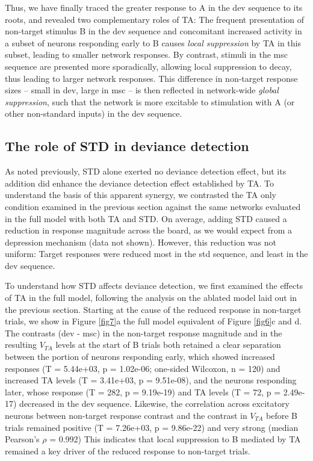 \documentclass[pdflatex,referee,iicol,sn-basic]{sn-jnl}
\theoremstyle{thmstyleone}%
\theoremstyle{thmstyletwo}%
\theoremstyle{thmstylethree}%
\begin{document}
Thus, we have finally traced the greater response to A in the dev sequence to its roots, and revealed two complementary roles of TA: The frequent presentation of non-target stimulus B in the dev sequence and concomitant increased activity in a subset of neurons responding early to B causes \emph{local suppression} by TA in this subset, leading to smaller network responses. By contrast, stimuli in the msc sequence are presented more sporadically, allowing local suppression to decay, thus leading to larger network responses. This difference in non-target response sizes -- small in dev, large in msc -- is then reflected in network-wide \emph{global suppression}, such that the network is more excitable to stimulation with A (or other non-standard inputs) in the dev sequence.

\subsection{The role of STD in deviance detection}\label{sec-std}

As noted previously, STD alone exerted no deviance detection effect, but its addition did enhance the deviance detection effect established by TA. To understand the basis of this apparent synergy, we contrasted the TA only condition examined in the previous section against the same networks evaluated in the full model with both TA and STD. On average, adding STD caused a reduction in response magnitude across the board, as we would expect from a depression mechanism (data not shown). However, this reduction was not uniform: Target responses were reduced most in the std sequence, and least in the dev sequence.

To understand how STD affects deviance detection, we first examined the effects of TA in the full model, following the analysis on the ablated model laid out in the previous section. Starting at the cause of the reduced response in non-target trials, we show in Figure \ref{fig7}a the full model equivalent of Figure \ref{fig6}c and d. The contrasts (dev - msc) in the non-target response magnitude and in the resulting $V_{TA}$ levels at the start of B trials both retained a clear separation between the portion of neurons responding early, which showed increased responses (T = 5.44e+03, p = 1.02e-06; one-sided Wilcoxon, n = 120) and increased TA levels (T = 3.41e+03, p = 9.51e-08), and the neurons responding later, whose response (T = 282, p = 9.19e-19) and TA levels (T = 72, p = 2.49e-17) decreased in the dev sequence. Likewise, the correlation across excitatory neurons between non-target response contrast and the contrast in $V_{TA}$ before B trials remained positive (T = 7.26e+03, p = 9.86e-22) and very strong (median Pearson's $\rho$ = 0.992) This indicates that local suppression to B mediated by TA remained a key driver of the reduced response to non-target trials.
\end{document}
